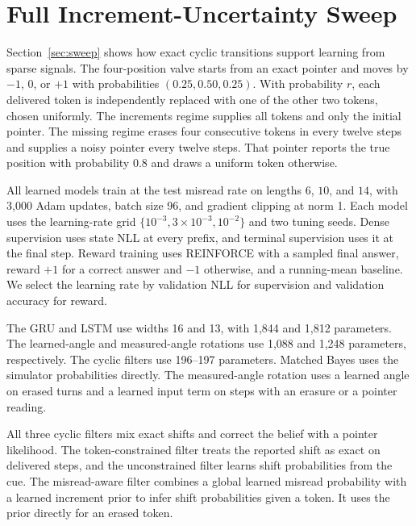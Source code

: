 \section{Full Increment-Uncertainty Sweep}
\label{app:sweep}

Section~\ref{sec:sweep} shows how exact cyclic transitions support learning
from sparse signals. The four-position valve starts from an exact pointer
and moves by $-1$, $0$, or $+1$ with probabilities $(0.25,0.50,0.25)$.
With probability $r$, each delivered token is independently replaced with
one of the other two tokens, chosen uniformly. The increments regime supplies
all tokens and only the initial pointer. The missing regime erases four
consecutive tokens in every twelve steps and supplies a noisy pointer every
twelve steps. That pointer reports the true position with probability $0.8$
and draws a uniform token otherwise.

All learned models train at the test misread rate on lengths $6$, $10$, and
$14$, with 3{,}000 Adam updates, batch size 96, and gradient clipping at norm 1.
Each model uses the learning-rate grid $\{10^{-3},3\times 10^{-3},10^{-2}\}$
and two tuning seeds. Dense supervision uses state NLL at every prefix, and
terminal supervision uses it at the final step. Reward training uses
REINFORCE with a sampled final answer, reward $+1$ for a correct answer and
$-1$ otherwise, and a running-mean baseline. We select the learning rate
by validation NLL for supervision and validation accuracy for reward.

The GRU and LSTM use widths 16 and 13, with
1{,}844 and 1{,}812 parameters. The learned-angle and measured-angle rotations
use 1{,}088 and 1{,}248 parameters, respectively. The cyclic filters use
196--197 parameters. Matched Bayes uses the simulator probabilities directly.
The measured-angle rotation uses a learned angle on erased turns and a learned
input term on steps with an erasure or a pointer reading.

All three cyclic filters mix exact shifts and correct the belief with a
pointer likelihood. The token-constrained filter treats the reported shift
as exact on delivered steps, and the unconstrained filter learns shift
probabilities from the cue. The misread-aware filter combines a global
learned misread probability with a learned increment prior to infer shift
probabilities given a token. It uses the prior directly for an erased token.

\newcommand{\sweepcell}[3]{\shortstack{#1 (#2)\\#3}}
\newcommand{\sweepdetails}{Cells give five-seed means for terminal NLL
(nats, with sample SD in parentheses) and terminal accuracy, with 1,024
episodes per seed and cell.}

